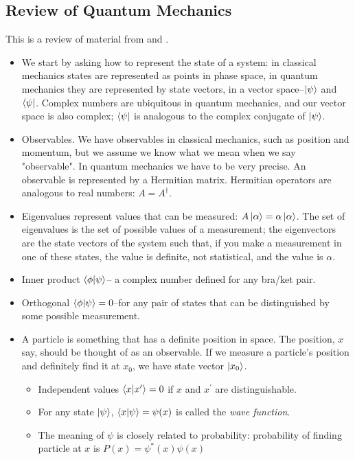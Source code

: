 \documentclass[]{article}
\begin{document}
\subsection{Review of Quantum Mechanics}
 This is a review of material from \cite[Quantum Mechanics]{susskind2007theoretical} and \cite{susskind2014quantum}.
\begin{itemize}
	\item We start by asking how to represent the state of a system: in classical mechanics states are represented as points in phase space, in quantum mechanics they are represented by state vectors, in a vector space--$\ket{\psi}$ and $\bra{\psi}$. Complex numbers are ubiquitous in quantum mechanics, and our vector space is also complex; $\bra{\psi}$ is analogous to the complex conjugate of $\ket{\psi}$.
	\item Observables. We have observables in classical mechanics, such as position and momentum, but we assume we know what we mean when we say "observable". In quantum mechanics we have to be very precise. An observable is represented by a Hermitian matrix. Hermitian operators are analogous to real numbers: $A=A^{\dag}$.
	\item Eigenvalues represent values that can be measured: $A\ket{\alpha} = \alpha\ket{\alpha}$. The set of eigenvalues is the set of possible values of a measurement; the eigenvectors are the state vectors of the system such that, if you make a measurement in one of these states, the value is definite, not statistical, and the value is $\alpha$.
	\item Inner product $\braket{\phi|\psi}$-- a complex number defined for any bra/ket pair.
	\item Orthogonal $\braket{\phi|\psi}=0$--for any pair of states that can be distinguished by some possible measurement.
	\item A particle is something that has a definite position in space. The position, $x$ say, should be thought of as an observable. If we measure a particle's position and definitely find it at $x_0$, we have state vector $\ket{x_0}$.
	\begin{itemize}
		\item Independent values $\braket{x|x^{\prime}}=0$ if $x$ and $x^{\prime}$ are distinguishable.
		\item For any state $\ket{\psi}$, $\braket{x|\psi} = \psi(x)$ is called the \emph{wave function}. 
		\item The meaning of $\psi$ is closely related to probability: probability of finding particle at $x$ is $P(x)=\psi^*(x)\psi(x)$

\end{itemize}
\end{itemize}
\end{document}
